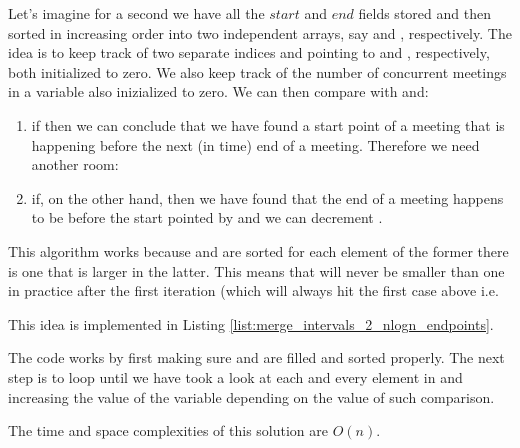 Let's imagine for a second we have all the $start$ and $end$ fields stored and then sorted in increasing order into two independent arrays, say  and , respectively. The idea is to keep track of two separate indices  and  pointing to  and , respectively, both initialized to zero. We also keep track of the number of concurrent meetings in a variable  also inizialized to zero.
We can then compare  with  and:
\begin{enumerate}
	\item if  then we can conclude that we have found a start point of a meeting that is happening before the next (in time) end of a meeting. Therefore we need another room: 
	\item  if, on the other hand,  then we have found that the end of a meeting happens to be before the start pointed by  and we can decrement .
\end{enumerate}

This algorithm works because  and  are sorted for each element of the former there is one that is larger in the latter. This means that  will never be smaller than one in practice after the first iteration (which will always hit the first case above i.e. 

This idea is implemented in Listing  \ref{list:merge_intervals_2_nlogn_endpoints}. 



The code works by first making sure  and  are filled and sorted properly. The next step is to loop until we have took a look at each and every element in  and increasing the value of the variable  depending on the value of such comparison.

The time and space complexities of this solution are $O(n)$.



